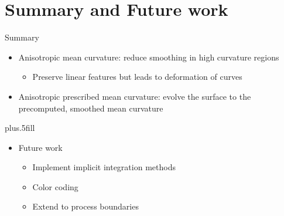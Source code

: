 \documentclass{beamer}
\begin{document}
\section{Summary and Future work}

\begin{frame}{Summary}
  \begin{itemize}
  \item
    Anisotropic mean curvature: reduce smoothing in high curvature regions
    \begin{itemize}
    \item Preserve linear features but leads to deformation of curves
    \end{itemize}
  \item
    Anisotropic prescribed mean curvature: evolve the surface to the precomputed, smoothed mean curvature
  \end{itemize}
  \vskip0pt plus.5fill
  \begin{itemize}
  \item
    Future work
    \begin{itemize}
    \item Implement implicit integration methods
    \item Color coding
    \item Extend to process boundaries
    \end{itemize}
  \end{itemize}
\end{frame}


    
    

 
    

\end{document}
